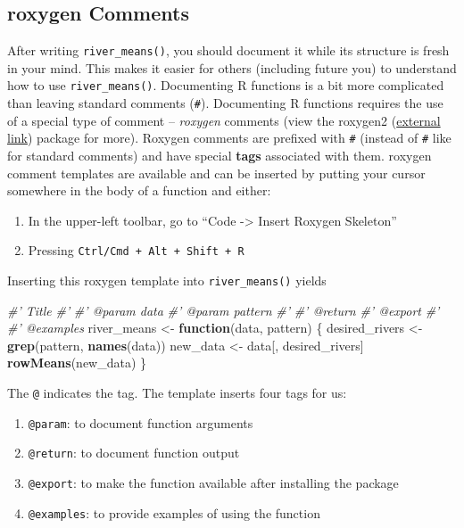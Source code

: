 \documentclass[
]{book}
\newenvironment{Shaded}{\begin{snugshade}}{\end{snugshade}}
\newcommand{\CommentTok}[1]{\textcolor[rgb]{0.56,0.35,0.01}{\textit{#1}}}
\newcommand{\ControlFlowTok}[1]{\textcolor[rgb]{0.13,0.29,0.53}{\textbf{#1}}}
\newcommand{\KeywordTok}[1]{\textcolor[rgb]{0.13,0.29,0.53}{\textbf{#1}}}
\newcommand{\NormalTok}[1]{#1}
\newcommand{\StringTok}[1]{\textcolor[rgb]{0.31,0.60,0.02}{#1}}
\providecommand{\tightlist}{%
  \setlength{\itemsep}{0pt}\setlength{\parskip}{0pt}}
\begin{document}
\hypertarget{roxygen}{%
\subsection{roxygen Comments}\label{roxygen}}

After writing \texttt{river\_means()}, you should document it while its structure is fresh in your mind. This makes it easier for others (including future you) to understand how to use \texttt{river\_means()}. Documenting R functions is a bit more complicated than leaving standard comments (\texttt{\#}). Documenting R functions requires the use of a special type of comment -- \emph{roxygen} comments (view the roxygen2 (\href{https://roxygen2.r-lib.org/}{external link}) package for more). Roxygen comments are prefixed with \texttt{\#\textquotesingle{}} (instead of \texttt{\#} like for standard comments) and have special \textbf{tags} associated with them. roxygen comment templates are available and can be inserted by putting your cursor somewhere in the body of a function and either:

\begin{enumerate}
\def\labelenumi{\arabic{enumi}.}
\tightlist
\item
  In the upper-left toolbar, go to ``Code -\textgreater{} Insert Roxygen Skeleton''
\item
  Pressing \texttt{Ctrl/Cmd\ +\ Alt\ +\ Shift\ +\ R}
\end{enumerate}

Inserting this roxygen template into \texttt{river\_means()} yields

\begin{Shaded}
\begin{Highlighting}[]
\CommentTok{#' Title}
\CommentTok{#'}
\CommentTok{#' @param data }
\CommentTok{#' @param pattern }
\CommentTok{#'}
\CommentTok{#' @return}
\CommentTok{#' @export}
\CommentTok{#'}
\CommentTok{#' @examples}
\NormalTok{river_means <-}\StringTok{ }\ControlFlowTok{function}\NormalTok{(data, pattern) \{}
\NormalTok{  desired_rivers <-}\StringTok{ }\KeywordTok{grep}\NormalTok{(pattern, }\KeywordTok{names}\NormalTok{(data))}
\NormalTok{  new_data <-}\StringTok{ }\NormalTok{data[, desired_rivers]}
  \KeywordTok{rowMeans}\NormalTok{(new_data)}
\NormalTok{\}}
\end{Highlighting}
\end{Shaded}

The \texttt{@} indicates the tag. The template inserts four tags for us:

\begin{enumerate}
\def\labelenumi{\arabic{enumi}.}
\tightlist
\item
  \texttt{@param}: to document function arguments
\item
  \texttt{@return}: to document function output
\item
  \texttt{@export}: to make the function available after installing the package
\item
  \texttt{@examples}: to provide examples of using the function
\end{enumerate}
\end{document}
